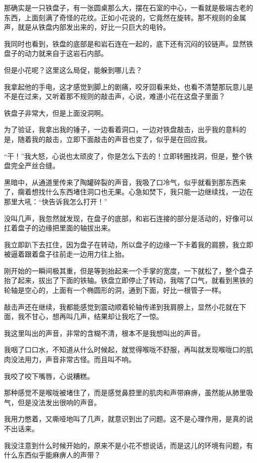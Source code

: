 那确实是一只铁盘子，有一张圆桌那么大，摆在石室的中心，一看就是极端古老的东西，上面刻满了奇怪的花纹。正如小花说的，它竟然在旋转。那不规则的金属声，就是从铁盘内部发出来的，好比一只巨大的电铃。

我同时也看到，铁盘的底部是和岩石连在一起的，底下还有沉闷的铰链声。显然铁盘子的动力就来自于这岩石内部。

但是小花呢？这里这么局促，能躲到哪儿去？

我拿起他的手电，这才感觉到脚上的剧痛，咬牙回看来处，也看不清楚那玩意儿是不是在过来，又听着那不规则的敲击声，心说，难道小花在这盘子里面？

铁盘子非常大，但是上面没洞啊。

为了验证，我拿出我的锤子，一边看着洞口，一边对铁盘敲击，出乎我的意料的是，随着我的敲击，立即下面敲击的声音也变了，似乎是在回应我。

“干！”我大怒，心说也太顽皮了，你是怎么下去的！立即转圈找洞，但是，整个铁盘完全严丝合缝。

黑暗中，从通道里传来了陶罐碎裂的声音，我吸了口冷气，似乎就看到那东西来了，瘸着想找什么东西堵住洞口也无果。心急如焚下，我只能一边继续找，一边在那里大吼：“快告诉我怎么打开！”

没叫几声，我忽然就发现，在盘子的底部，和岩石连接的部分是活动的，好像可以扛着盘子的边缘把里面的轴拔出来。

我立即趴下去扛住，因为盘子在转动，所以盘子的边缘一下卡着我的肩膀，我立即被逼着跟着盘子往前走一边用力往上抬。

刚开始的一瞬间极其重，但是等到抬起来一个手掌的宽度，一下就松了，整个盘子抬了起来，拔出了下面的铁轴。铁盘立即停止了转动，我喘了口气，就看到黑铁的轮轴是空心的，上面有一个椭圆形的洞，通到下面，好比一根管子一样。

敲击声还在继续，我都能感觉到震动顺着轮轴传递到我肩膀上，显然小花就在下面，我不甘心，想再叫几声，结果却让我吃了一惊。

我这里叫出的声音，非常的含糊不清，根本不是我想叫出的声音。

我咽了口口水，不知道从什么时候起，就觉得喉咙不舒服，再叫就发现喉咙口的肌肉没法用力，声音非常古怪。而且叫不响。

我咬了咬下嘴唇，心说糟糕。

那种感觉不是喉咙被堵住了，而是感觉鼻腔里的肌肉和声带麻痹，虽然能从肺里吸气，但是没法发出很响的声音。

我用力憋着，又嘶哑地叫了几声，就意识到出了问题。这不是心理作用，是真的说不出话来。

我没注意到什么时候开始的，原来不是小花不想说话，而是这儿的环境有问题，有什么东西似乎能麻痹人的声带？

